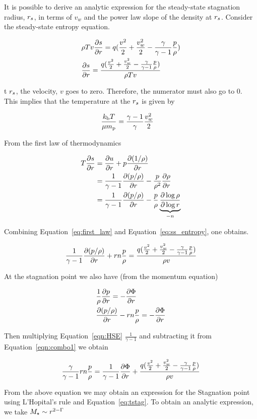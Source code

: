 It is possible to derive an analytic expression for the steady-state stagnation radius, $r_s$, in terms of $v_w$ and the power law slope of the density at $r_s$.  Consider the steady-state entropy equation.

\begin{align}
&\rho T v \frac{\partial s}{\partial r}=q (\frac{v^2}{2}+\frac{v_w^2}{2}-\frac{\gamma}{\gamma-1} \frac{p}{\rho})\\
&\frac{\partial s}{\partial r}=\frac{q (\frac{v^2}{2}+\frac{v_w^2}{2}-\frac{\gamma}{\gamma-1} \frac{p}{\rho})}{\rho T v} \label{eq:ss_entropy}
\end{align}

t $r_s$, the velocity, $v$ goes to zero.  Therefore, the numerator must also go to 0. This implies that the  temperature at the $r_s$ is given by

\begin{align}
 &\frac{k_{\rm b} T}{\mu m_{\rm p}}=\frac{\gamma-1}{\gamma} \frac{v_w^2}{2} 
\label{eq:Tanalytic}
\end{align}

From the first law of thermodynamics 

\begin{align}
T\frac{\partial s}{\partial r}&=\frac{\partial u}{\partial r}+p\frac{\partial (1/\rho)}{\partial r}\\
&=\frac{1}{\gamma-1}\frac{\partial (p/\rho)}{\partial r}-\frac{p}{\rho^2}\frac{\partial \rho}{\partial r}\\
&=\frac{1}{\gamma-1}\frac{\partial (p/\rho)}{\partial r}-\frac{p}{\rho} \underbrace{\frac{\partial \log{\rho}}{\partial \log{r}}}_{-n} \label{eq:first_law}
\end{align}

Combining Equation~\ref{eq:first_law} and Equation~\ref{eq:ss_entropy}, one obtains.

\begin{align}
\frac{1}{\gamma-1}\frac{\partial (p/\rho)}{\partial r}+r n \frac{p}{\rho}=\frac{q (\frac{v^2}{2}+\frac{v_w^2}{2}-\frac{\gamma}{\gamma-1} \frac{p}{\rho})}{\rho  v} \label{eqn:combo1}
\end{align}

At the stagnation point we also have (from the momentum equation)

\begin{align}
&\frac{1}{\rho}\frac{\partial p}{\partial r}=-\frac{\partial \Phi}{\partial r}\\
&\frac{\partial (p/\rho)}{\partial r}-r n \frac{p}{\rho}=-\frac{\partial \Phi}{\partial r} \label{eqn:HSE}
\end{align}

Then multiplying Equation~\ref{eqn:HSE}  $\frac{1}{\gamma-1}$ and subtracting it from Equation~\ref{eqn:combo1} we obtain

\begin{align}
\frac{\gamma}{\gamma-1} r n \frac{p}{\rho} = \frac{1}{\gamma-1} \frac{\partial \Phi}{\partial r} + \frac{q (\frac{v^2}{2}+\frac{v_w^2}{2}-\frac{\gamma}{\gamma-1} \frac{p}{\rho})}{\rho  v}
\end{align}

From the above equation we may obtain an expression for the Stagnation point using L'Hopital's rule and Equation~\ref{eq:tstag}. To obtain an analytic expression, we take $M_{\star}\sim r^{2-\Gamma}$

